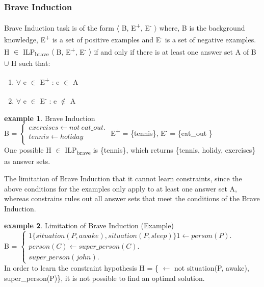 \documentclass[12pt,twoside]{report}
\theoremstyle{plain}
\theoremstyle{definition}
\newtheorem{examp}{example}[section]
\begin{document}
\label{limitation_cautious}

\subsubsection{Brave Induction}
Brave Induction task is of the form $\langle$ B, E\textsuperscript{+}, E\textsuperscript{-} $\rangle$ where, B is the background knowledge, E\textsuperscript{+} is a set of positive examples and E\textsuperscript{-} is a set of negative examples.
 H $\in$ ILP\textsubscript{brave} $\langle$ B, E\textsuperscript{+}, E\textsuperscript{-} $\rangle$ if and only if there is at least one answer set A of B $\cup$ H such that: \\
\begin{enumerate}
\item $\forall$ e $\in$ E\textsuperscript{+} : e $\in$ A \\
\item $\forall$ e $\in$ E\textsuperscript{-} : e $\notin$ A \\
\end{enumerate}

\begin{examp} \normalfont Brave Induction \\

B = $\begin{cases}
	exercises  \leftarrow not \ eat\_out. \\
	tennis \leftarrow holiday \\
      \end{cases}$
E\textsuperscript{+} = \{tennis\},   E\textsuperscript{-} = \{eat\_out \} \\

One possible  H $\in$ ILP\textsubscript{brave} is \{tennis\}, which returns \{tennis, holidy, exercises\} as answer sets.
\end{examp}
\label{brave_induction_example}

The limitation of Brave Induction that it cannot learn constraints, since the above conditions for the examples only apply to at least one answer set A, whereas constrains rules out all answer sets that meet  the conditions of the Brave Induction.

\begin{examp} \normalfont Limitation of Brave Induction (Example) \\

B = $\begin{cases}
	1\{situation(P, awake), situation(P, sleep)\}1 \leftarrow person(P). \\
	person(C) \leftarrow super\_person(C). \\
	super\_person(john).
	\end{cases}$ \\

In order to learn the  constraint hypothesis H = \{ $\leftarrow$ not situation(P, awake), super\_person(P)\}, it is not possible to find an optimal solution.
\end{examp}
\label{limitation_brave}
\end{document}
